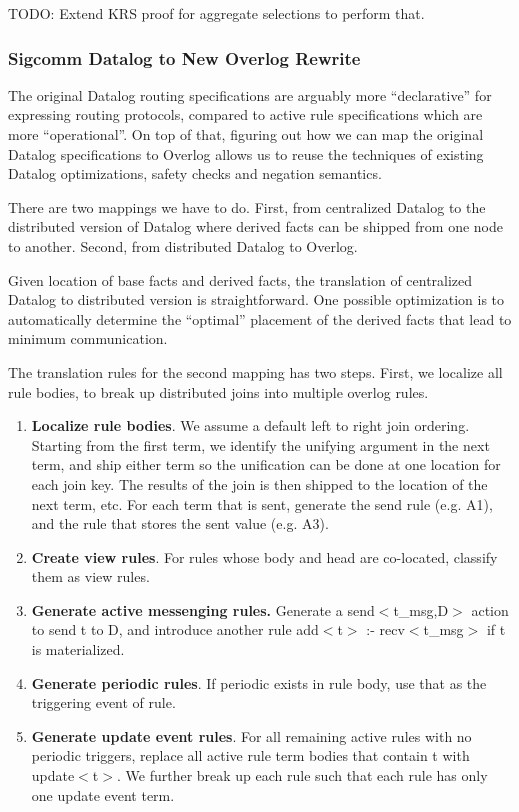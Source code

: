 \documentclass{article}
\begin{document}
TODO: Extend KRS proof for aggregate selections to perform that.

\subsubsection{Sigcomm Datalog to New Overlog Rewrite}

The original Datalog routing specifications are arguably more
``declarative'' for expressing routing protocols, compared to active
rule specifications which are more ``operational''. On top of that,
figuring out how we can map the original Datalog specifications to Overlog allows
us to reuse the techniques of existing Datalog optimizations, safety
checks and negation semantics.

There are two mappings we have to do. First, from centralized Datalog to the
distributed version of Datalog where derived facts can be shipped from
one node to another. Second, from distributed Datalog to Overlog. 

Given location of base facts and derived facts, the translation of centralized Datalog to
distributed version is straightforward. One possible optimization is to
automatically determine the ``optimal'' placement of the derived facts
that lead to minimum communication. 

The translation rules for the second mapping has two steps. First, we
localize all rule bodies, to break up distributed joins into multiple
overlog rules. 

\begin{enumerate}
\item {\bf Localize rule bodies}. We assume a default left to right join
  ordering. Starting from the first term, we identify the unifying argument in the next term, and ship either
  term so the unification can be done at one location for each join
  key. The results of the join is then shipped to the location of the
  next term, etc. For each term that is sent, generate the send rule 
  (e.g. A1), and the rule that stores the sent value (e.g. A3).

\item {\bf Create view rules}. For rules whose body and head are
  co-located, classify them as view rules.  

\item {\bf Generate active messenging rules.} Generate a
  send$<$t\_msg,D$>$ action to send t to D, and introduce another rule
  add$<$t$>$ :- recv$<$t\_msg$>$ if t is materialized. 

\item{\bf Generate periodic rules}. If periodic exists in rule body, use
  that as the triggering event of rule.

\item{\bf Generate update event rules}. For all remaining active rules with no
  periodic triggers, replace all
  active rule term bodies that contain t with update$<$t$>$. We further break up each rule
  such that each rule has only one update event term.


\end{enumerate}
\end{document}
